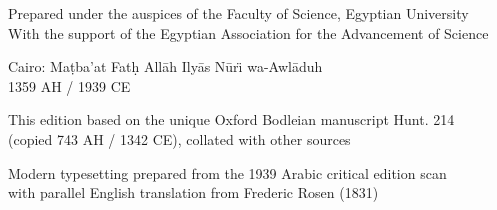 \documentclass[11pt,a4paper]{book}
\begin{document}
\begin{titlepage}
\begin{center}
\vspace{1cm}

{\small Prepared under the auspices of the Faculty of Science, Egyptian University}\\[0.2cm]
{\small With the support of the Egyptian Association for the Advancement of Science}

\vspace{0.8cm}

{\large Cairo: Ma\d{t}ba'at Fat\d{h} All\=ah Ily\=as N\=ur\"{\i} wa-Awl\=aduh}\\[0.2cm]
{\large 1359 AH / 1939 CE}

\vspace{0.5cm}

{\small This edition based on the unique Oxford Bodleian manuscript Hunt. 214}\\[0.1cm]
{\small (copied 743 AH / 1342 CE), collated with other sources}

\vfill

{\footnotesize Modern typesetting prepared from the 1939 Arabic critical edition scan}\\[0.1cm]
{\footnotesize with parallel English translation from Frederic Rosen (1831)}

\end{center}
\end{titlepage}
\end{document}
